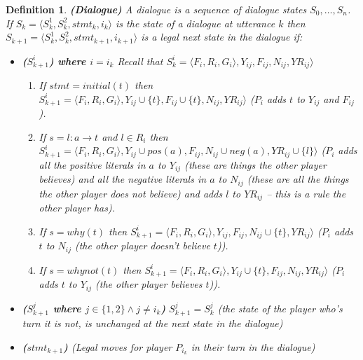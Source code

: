 \documentclass{blue-book}
\newtheorem{definition}{Definition}
\newcommand{\drule}[3]{\ensuremath{#1:#2 \rightarrow #3}}
\begin{document}
\begin{definition}{\bf (Dialogue)}
A dialogue is a sequence of dialogue states $S_0, \ldots, S_n$.
If $S_k = \langle S^1_{k}, S^2_{k}, stmt_k, i_k\rangle$ is the state of a dialogue at utterance $k$ then $S_{k+1} = \langle S^1_{k}, S^2_{k}, stmt_{k + 1}, i_{k + 1}\rangle$ is a legal next state in the dialogue if:

\begin{itemize}

\item  {\bf ($S^i_{k+1}$) where $i = i_k$} Recall that $S^i_k =  \langle F_i, R_i, G_i \rangle, Y_{ij}, F_{ij}, N_{ij}, YR_{ij} \rangle$
\begin{enumerate}
\item If $stmt = initial(t)$ then $S^i_{k+1}= \langle F_i, R_i, G_i \rangle, Y_{ij} \cup \{t\}, F_{ij} \cup \{t\}, N_{ij}, YR_{ij} \rangle$ 
($P_i$ adds $t$ to $Y_{ij}$ and $F_{ij}$).  
\item If $s = \drule{l}{a}{t}$ and $l  \in R_i$ then $S^i_{k + 1} = \langle F_i, R_i, G_i \rangle, Y_{ij} \cup pos(a), F_{ij}, N_{ij} \cup neg(a), YR_{ij} \cup \{l\} \rangle$
($P_i$ adds all the positive literals in $a$ to $Y_{ij}$ (these are things the other player believes) and all the negative literals in $a$ to $N_{ij}$ (these are all the things the other player does not believe) and adds $l$ to $YR_{ij}$ -- this is a rule the other player has). 
\item If $s = why(t)$ then $S^i_{k + 1} = \langle F_i, R_i, G_i \rangle, Y_{ij}  , F_{ij}, N_{ij} \cup \{t\}, YR_{ij} \rangle$ ($P_i$ adds $t$ to $N_{ij}$ (the other player doesn't believe $t$)). 
\item If $s = whynot(t)$ then $S^i_{k + 1} = \langle F_i, R_i, G_i \rangle, Y_{ij} \cup \{t\}, F_{ij}, N_{ij} , YR_{ij} \rangle$  ($P_i$ adds $t$ to $Y_{ij}$ (the other player believes $t$)). 
\end{enumerate}

\item {\bf ($S^j_{k+1}$ where $j \in \{1, 2\} \wedge j \neq i_k$)} $S^j_{k+1} = S^j_{k}$ (the state of the player who's turn it is not, is unchanged at the next state in the dialogue)

\item {\bf ($stmt_{k+1}$)} (Legal  moves for player $P_{i_k}$ in their turn in the dialogue)


\end{itemize}
\end{definition}
\end{document}
